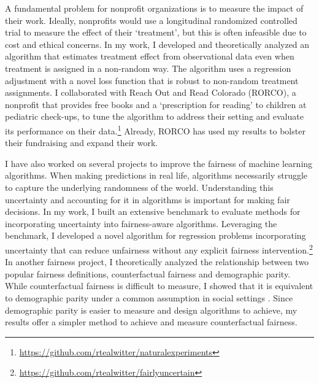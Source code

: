 \documentclass[11pt]{article}
\begin{document}
A fundamental problem for nonprofit organizations is to measure the impact of their work.
Ideally, nonprofits would use a longitudinal randomized controlled trial to measure the effect of their `treatment', but this is often infeasible due to cost and ethical concerns.
In my work, I developed and theoretically analyzed an algorithm that estimates treatment effect from observational data even when treatment is assigned in a non-random way.
The algorithm uses a regression adjustment with a novel loss function that is robust to non-random treatment assignments.
I collaborated with Reach Out and Read Colorado (RORCO), a nonprofit that provides free books and a `prescription for reading' to children at pediatric check-ups, to tune the algorithm to address their setting and evaluate its performance on their data.\footnote{\url{https://github.com/rtealwitter/naturalexperiments}}
Already, RORCO has used my results to bolster their fundraising and expand their work.

I have also worked on several projects to improve the fairness of machine learning algorithms.
When making predictions in real life, algorithms necessarily struggle to capture the underlying randomness of the world.
Understanding this uncertainty and accounting for it in algorithms is important for making fair decisions.
In my work, I built an extensive benchmark to evaluate methods for incorporating uncertainty into fairness-aware algorithms.
Leveraging the benchmark, I developed a novel algorithm for regression problems incorporating uncertainty that can reduce unfairness without any explicit fairness intervention.\footnote{\url{https://github.com/rtealwitter/fairlyuncertain}}
In another fairness project, I theoretically analyzed the relationship between two popular fairness definitions, counterfactual fairness and demographic parity.
While counterfactual fairness is difficult to measure, I showed that it is equivalent to demographic parity under a common assumption in social settings \cite{rosenblatt2023counterfactual}.
Since demographic parity is easier to measure and design algorithms to achieve, my results offer a simpler method to achieve and measure counterfactual fairness.

\end{document}
